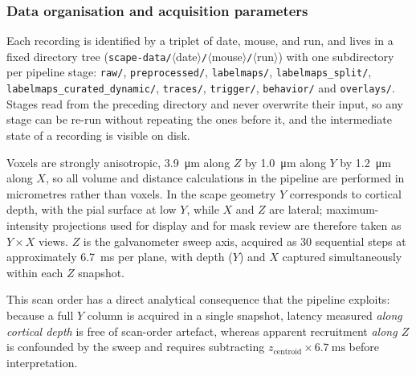 
		\subsubsection{Data organisation and acquisition parameters}

			Each recording is identified by a triplet of date, mouse, and run,
			and lives in a fixed directory tree
			(\texttt{scape-data/}$\langle$date$\rangle$\texttt{/}$\langle$mouse$\rangle$\texttt{/}$\langle$run$\rangle$) with
			one subdirectory per pipeline stage: \texttt{raw/},
			\texttt{preprocessed/}, \texttt{labelmaps/},
			\texttt{labelmaps\_split/}, \texttt{labelmaps\_curated\_dynamic/},
			\texttt{traces/}, \texttt{trigger/}, \texttt{behavior/} and
			\texttt{overlays/}.
			Stages read from the preceding directory and never overwrite their
			input, so any stage can be re-run without repeating the ones before
			it, and the intermediate state of a recording is visible on disk.

			Voxels are strongly anisotropic, \SI{3.9}{\micro\meter} along $Z$ by
			\SI{1.0}{\micro\meter} along $Y$ by \SI{1.2}{\micro\meter} along $X$,
			so all volume and distance calculations in the pipeline are performed
			in micrometres rather than voxels.
			In the \acrshort{scape} geometry $Y$ corresponds to cortical depth,
			with the pial surface at low $Y$, while $X$ and $Z$ are lateral;
			maximum-intensity projections used for display and for mask review
			are therefore taken as $Y \times X$ views.
			$Z$ is the galvanometer sweep axis, acquired as 30 sequential steps
			at approximately \SI{6.7}{\milli\second} per plane, with depth ($Y$)
			and $X$ captured simultaneously within each $Z$ snapshot.

			This scan order has a direct analytical consequence that the pipeline
			exploits: because a full $Y$ column is acquired in a single snapshot,
			latency measured \emph{along cortical depth} is free of scan-order
			artefact, whereas apparent recruitment \emph{along $Z$} is
			confounded by the sweep and requires subtracting
			$z_\mathrm{centroid} \times \SI{6.7}{\milli\second}$ before
			interpretation.

